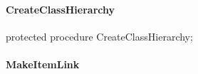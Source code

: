 \documentclass{report}
\newif\ifpdf
\begin{document}
\paragraph*{CreateClassHierarchy}\hspace*{\fill}

\label{PasDoc_Gen.TDocGenerator-CreateClassHierarchy}
\begin{list}{}{
\setlength{\itemindent}{0cm}
\setlength{\listparindent}{0cm}
\setlength{\leftmargin}{\evensidemargin}
\addtolength{\leftmargin}{\tmplength}
\settowidth{\labelsep}{X}
\addtolength{\leftmargin}{\labelsep}
\setlength{\labelwidth}{\tmplength}
}
\item[\textbf{Declaration}\hfill]
\ifpdf
\begin{flushleft}
\fi
\begin{ttfamily}
protected procedure CreateClassHierarchy;\end{ttfamily}

\ifpdf
\end{flushleft}
\fi

\end{list}
\paragraph*{MakeItemLink}\hspace*{\fill}
\end{document}
